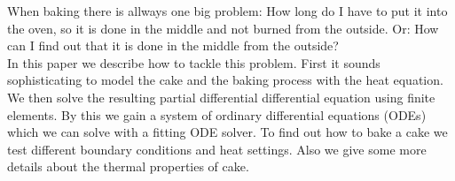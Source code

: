 
When baking there is allways one big problem: How long do I have to put it into the oven, so it is done in the middle and not burned from the outside. Or: How can I find out that it is done in the middle from the outside? \\

 In this paper we describe how to tackle this problem. First it sounds sophisticating to model the cake and the baking process with the heat equation. We then solve the resulting partial differential differential equation using finite elements. By this we gain a system of ordinary differential equations (ODEs) which we can solve with a fitting ODE solver. To find out how to bake a cake we test different boundary conditions and heat settings. Also we give some more details about the thermal properties of cake.
